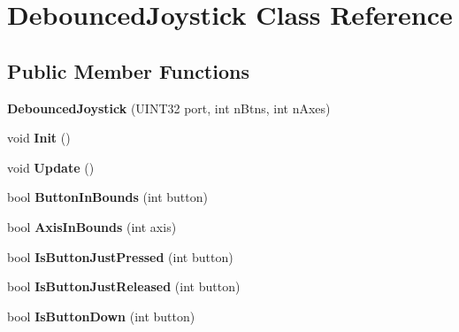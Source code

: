 \hypertarget{class_debounced_joystick}{
\section{\-Debounced\-Joystick \-Class \-Reference}
\label{class_debounced_joystick}
}
\subsection*{\-Public \-Member \-Functions}
\begin{DoxyCompactItemize}
\item 
\hypertarget{class_debounced_joystick_a0e6dc7502c535fd7926bc0f1d5a46757}{
{\bfseries \-Debounced\-Joystick} (\-U\-I\-N\-T32 port, int n\-Btns, int n\-Axes)}
\label{class_debounced_joystick_a0e6dc7502c535fd7926bc0f1d5a46757}

\item 
\hypertarget{class_debounced_joystick_a1734f9457e5376acdfe74dcd9c84c4ef}{
void {\bfseries \-Init} ()}
\label{class_debounced_joystick_a1734f9457e5376acdfe74dcd9c84c4ef}

\item 
\hypertarget{class_debounced_joystick_a56172e067e669025e1172e47285fbe4b}{
void {\bfseries \-Update} ()}
\label{class_debounced_joystick_a56172e067e669025e1172e47285fbe4b}

\item 
\hypertarget{class_debounced_joystick_abb7370fff3c6432ae89f8177c893c53e}{
bool {\bfseries \-Button\-In\-Bounds} (int button)}
\label{class_debounced_joystick_abb7370fff3c6432ae89f8177c893c53e}

\item 
\hypertarget{class_debounced_joystick_ac957606489bcdaa1a24153579f518a87}{
bool {\bfseries \-Axis\-In\-Bounds} (int axis)}
\label{class_debounced_joystick_ac957606489bcdaa1a24153579f518a87}

\item 
\hypertarget{class_debounced_joystick_ac37bd6a8c9a9ac5435448ee21093a461}{
bool {\bfseries \-Is\-Button\-Just\-Pressed} (int button)}
\label{class_debounced_joystick_ac37bd6a8c9a9ac5435448ee21093a461}

\item 
\hypertarget{class_debounced_joystick_a55a0a70552ac1d751b012872e2e18f1a}{
bool {\bfseries \-Is\-Button\-Just\-Released} (int button)}
\label{class_debounced_joystick_a55a0a70552ac1d751b012872e2e18f1a}

\item 
\hypertarget{class_debounced_joystick_ace037efd8c60477585092027691525e0}{
bool {\bfseries \-Is\-Button\-Down} (int button)}
\label{class_debounced_joystick_ace037efd8c60477585092027691525e0}


\end{DoxyCompactItemize}
